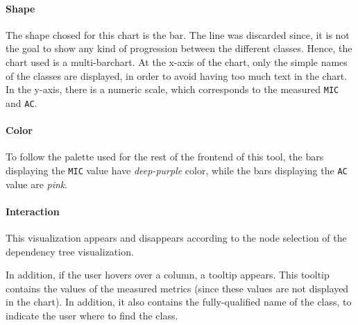 \paragraph{Shape}
The shape chosed for this chart is the bar. The line was discarded since, it is not the goal to show any kind of progression between the different classes. Hence, the chart used is a multi-barchart.
At the x-axis of the chart, only the simple names of the classes are displayed, in order to avoid having too much text in the chart. In the y-axis, there is a numeric scale, which corresponds to the measured \texttt{MIC} and \texttt{AC}.

\paragraph{Color}
To follow the palette used for the rest of the frontend of this tool, the bars displaying the \texttt{MIC} value have \textit{deep-purple} color, while the bars displaying the \texttt{AC} value are \textit{pink}.

\paragraph{Interaction}
This visualization appears and disappears according to the node selection of the dependency tree visualization.

In addition, if the user hovers over a column, a tooltip appears. This tooltip contains the values of the measured metrics (since these values are not displayed in the chart). In addition, it also contains the fully-qualified name of the class, to indicate the user where to find the class.
